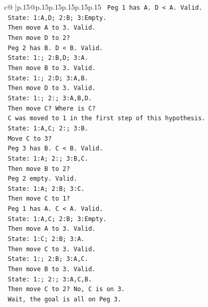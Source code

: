 \documentclass{article}
\begin{document}
{\begin{supertabular}{c@{$\;$}|p{.15\linewidth}@{}p{.15\linewidth}p{.15\linewidth}p{.15\linewidth}p{.15\linewidth}p{.15\linewidth}}
{{{\texttt{            Peg 1 has A. D < A. Valid.} \\
\texttt{            State: 1:A,D; 2:B; 3:Empty.} \\
\texttt{            Then move A to 3. Valid.} \\
\texttt{            Then move D to 2?} \\
\texttt{            Peg 2 has B. D < B. Valid.} \\
\texttt{            State: 1:; 2:B,D; 3:A.} \\
\texttt{            Then move B to 3. Valid.} \\
\texttt{            State: 1:; 2:D; 3:A,B.} \\
\texttt{            Then move D to 3. Valid.} \\
\texttt{            State: 1:; 2:; 3:A,B,D.} \\
\texttt{            Then move C? Where is C?} \\
\texttt{            C was moved to 1 in the first step of this hypothesis.} \\
\texttt{            State: 1:A,C; 2:; 3:B.} \\
\texttt{            Move C to 3?} \\
\texttt{            Peg 3 has B. C < B. Valid.} \\
\texttt{            State: 1:A; 2:; 3:B,C.} \\
\texttt{            Then move B to 2?} \\
\texttt{            Peg 2 empty. Valid.} \\
\texttt{            State: 1:A; 2:B; 3:C.} \\
\texttt{            Then move C to 1?} \\
\texttt{            Peg 1 has A. C < A. Valid.} \\
\texttt{            State: 1:A,C; 2:B; 3:Empty.} \\
\texttt{            Then move A to 3. Valid.} \\
\texttt{            State: 1:C; 2:B; 3:A.} \\
\texttt{            Then move C to 3. Valid.} \\
\texttt{            State: 1:; 2:B; 3:A,C.} \\
\texttt{            Then move B to 3. Valid.} \\
\texttt{            State: 1:; 2:; 3:A,C,B.} \\
\texttt{            Then move C to 2? No, C is on 3.} \\
\texttt{            Wait, the goal is all on Peg 3.} \\
}}}
\end{supertabular}}
\end{document}
